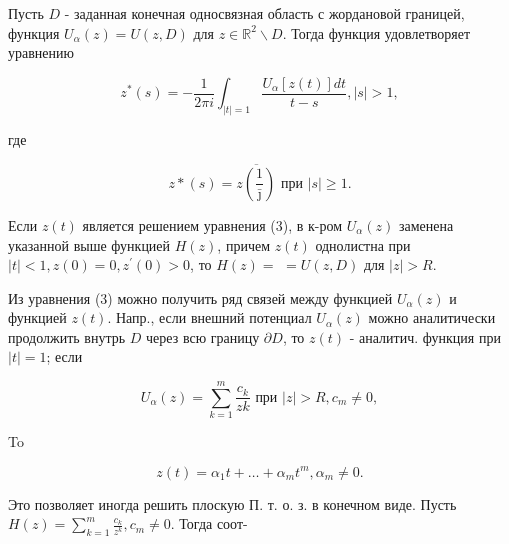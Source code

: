 \documentclass[10pt]{article}
\begin{document}
Пусть $D$ - заданная конечная односвязная область с жордановой границей, функция $U_{\alpha}(z)=U(z, D)$ для $z \in \mathbb{R}^{2} \backslash D$. Тогда функция удовлетворяет уравнению



\[

z^{*}(s)=-\frac{1}{2 \pi i} \int_{|t|=1} \frac{U_{\alpha}[z(t)] d t}{t-s},|s|>1,

\]



где



\[

z *(s)=\overline{z\left(\frac{1}{\bar{\jmath}}\right)} \text { при }|s| \geqslant 1 .

\]



Если $z(t)$ является решением уравнения (3), в к-ром $U_{\alpha}(z)$ заменена указанной выше функцией $H(z)$, причем $z(t)$ однолистна при $|t|<1, z(0)=0, z^{\prime}(0)>0$, то $H(z)=$ $=U(z, D)$ для $|z|>R$.



Из уравнения (3) можно получить ряд связей между функцией $U_{\alpha}(z)$ и функцией $z(t)$. Напр., если внешний потенциал $U_{\alpha}(z)$ можно аналитически продолжить внутрь $D$ через всю границу $\partial D$, то $z(t)$ - аналитич. функция при $|t|=1$; если



\[

U_{\alpha}(z)=\sum_{k=1}^{m} \frac{c_{k}}{z k} \text { при }|z|>R, c_{m} \neq 0,

\]



To



\[

z(t)=\alpha_{1} t+\ldots+\alpha_{m} t^{m}, \alpha_{m} \neq 0 .

\]



Это позволяет иногда решить плоскую П. т. о. з. в конечном виде. Пусть $H(z)=\sum_{k=1}^{m} \frac{c_{k}}{z^{k}}, c_{m} \neq 0$. Тогда соот-
\end{document}
